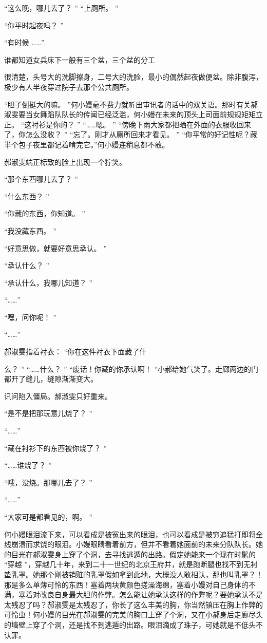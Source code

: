 \documentclass[12pt,twoside,openany]{book}
\begin{document}
“这么晚，哪儿去了？ ” “上厕所。 ”

“你平时起夜吗？ ”

“有时候 ……”

谁都知道女兵床下一般有三个盆，三个盆的分工

很清楚，头号大的洗脚擦身，二号大的洗脸，最小的偶然起夜做便盆。除非腹泻，极少有人半夜穿过院子去那个公共厕所。

“胆子倒挺大的嘛。 ”何小嫚毫不费力就听出审讯者的话中的双关语。那时有关郝淑雯要当女舞蹈队队长的传闻已经泛滥，何小嫚在未来的顶头上司面前规规矩矩立正。 “这衬衫是你的？ ” “……嗯。 ” “傍晚下雨大家都把晒在外面的衣服收回来了，你怎么没收？ ” “忘了。刚才从厕所回来才看见。 ” “你平常的好记性呢？藏半个包子夜里都记着啃完它。”何小嫚连稍息都不敢。

郝淑雯端正标致的脸上出现一个狞笑。

“那个东西哪儿去了？ ”

“什么东西？ ”

“你藏的东西，你知道。 ”

“我没藏东西。 ”

“好意思做，就要好意思承认。 ”

“承认什么？ ”

“承认什么，我哪儿知道？ ”

“……”

“嘿，问你呢！ ”

“……”

郝淑雯指着衬衣： “你在这件衬衣下面藏了什

么？ 	” “……什么？ ” “废话！你藏的你承认啊！ ”小郝给她气笑了。走廊两边的门都开了缝儿，缝隙渐渐变大。

讯问陷入僵局。郝淑雯只好重来。

“是不是把那玩意儿烧了？ ”

“……”

“藏在衬衫下的东西被你烧了？ ”

“……谁烧了？ ”

“哦，没烧。那哪儿去了？ ”

“……”

“大家可是都看见的，啊。 ”

何小嫚眼泪流下来，可以看成是被冤出来的眼泪，也可以看成是被穷追猛打即将全线崩溃而求饶的眼泪。小嫚眼睛看着前方，但并不看着她面前的未来分队队长。她的目光在郝淑雯身上穿了个洞，去寻找逃遁的出路。假定她能来一个现在时髦的 “穿越 ”，穿越几十年，来到二十一世纪的北京王府井，就是跑断腿也找不到无衬垫乳罩。她那个刚被销赃的乳罩假如拿到此地，大概没人敢相认，那也叫乳罩？！那是多么单薄可怜的东西！塞着两块黄颜色搓澡海绵，塞着小嫚对自己身体的不满，塞着对改良自身最大胆的作弊。怎么能让她承认这样的作弊呢？要她承认不是太残忍了吗？郝淑雯是太残忍了，你长了这么丰美的胸，你当然镇压在胸上作弊的可怜虫！何小嫚的目光在郝淑雯的完美的胸口上穿了个洞，又在小郝身后走廊尽头的墙壁上穿了个洞，还是找不到逃遁的出路。眼泪滴成了珠子，可她就是不低头不认罪。
\end{document}
